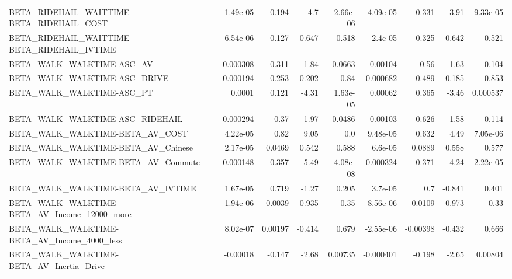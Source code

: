 \begin{tabular}{lrrrrrrrr}
BETA\_RIDEHAIL\_WAITTIME-BETA\_RIDEHAIL\_COST          &    1.49e-05 &        0.194 &      4.7 & 2.66e-06 &   4.09e-05 &       0.331 &         3.91 &      9.33e-05 \\
BETA\_RIDEHAIL\_WAITTIME-BETA\_RIDEHAIL\_IVTIME        &    6.54e-06 &        0.127 &    0.647 &    0.518 &    2.4e-05 &       0.325 &        0.642 &         0.521 \\
BETA\_WALK\_WALKTIME-ASC\_AV                          &    0.000308 &        0.311 &     1.84 &   0.0663 &    0.00104 &        0.56 &         1.63 &         0.104 \\
BETA\_WALK\_WALKTIME-ASC\_DRIVE                       &    0.000194 &        0.253 &    0.202 &     0.84 &   0.000682 &       0.489 &        0.185 &         0.853 \\
BETA\_WALK\_WALKTIME-ASC\_PT                          &      0.0001 &        0.121 &    -4.31 & 1.63e-05 &    0.00062 &       0.365 &        -3.46 &      0.000537 \\
BETA\_WALK\_WALKTIME-ASC\_RIDEHAIL                    &    0.000294 &         0.37 &     1.97 &   0.0486 &    0.00103 &       0.626 &         1.58 &         0.114 \\
BETA\_WALK\_WALKTIME-BETA\_AV\_COST                    &    4.22e-05 &         0.82 &     9.05 &      0.0 &   9.48e-05 &       0.632 &         4.49 &      7.05e-06 \\
BETA\_WALK\_WALKTIME-BETA\_AV\_Chinese                 &    2.17e-05 &       0.0469 &    0.542 &    0.588 &    6.6e-05 &      0.0889 &        0.558 &         0.577 \\
BETA\_WALK\_WALKTIME-BETA\_AV\_Commute                 &   -0.000148 &       -0.357 &    -5.49 & 4.08e-08 &  -0.000324 &      -0.371 &        -4.24 &      2.22e-05 \\
BETA\_WALK\_WALKTIME-BETA\_AV\_IVTIME                  &    1.67e-05 &        0.719 &    -1.27 &    0.205 &    3.7e-05 &         0.7 &       -0.841 &         0.401 \\
BETA\_WALK\_WALKTIME-BETA\_AV\_Income\_12000\_more       &   -1.94e-06 &      -0.0039 &   -0.935 &     0.35 &   8.56e-06 &      0.0109 &       -0.973 &          0.33 \\
BETA\_WALK\_WALKTIME-BETA\_AV\_Income\_4000\_less        &    8.02e-07 &      0.00197 &   -0.414 &    0.679 &  -2.55e-06 &    -0.00398 &       -0.432 &         0.666 \\
BETA\_WALK\_WALKTIME-BETA\_AV\_Inertia\_Drive           &    -0.00018 &       -0.147 &    -2.68 &  0.00735 &  -0.000401 &      -0.198 &        -2.65 &       0.00804 \\

\end{tabular}
